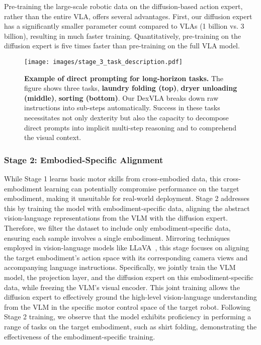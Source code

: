 Pre-training the large-scale robotic data on the diffusion-based action expert, rather than the entire VLA, offers several advantages. First, our diffusion expert has a significantly smaller parameter count compared to VLAs (1 billion vs. 3 billion), resulting in much faster training. Quantitatively, pre-training on the diffusion expert is five times faster than pre-training on the full VLA model.

\begin{figure*}[t]
    \centering
    \texttt{[image: images/stage\_3\_task\_description.pdf]}
    \caption{\textbf{Example of direct prompting for long-horizon tasks. } The figure shows three tasks, \textbf{laundry folding (top)}, \textbf{dryer unloading (middle)},  \textbf{sorting (bottom)}. Our DexVLA breaks down raw instructions into sub-steps automatically. Success in these tasks necessitates not only dexterity but also the capacity to decompose direct prompts into implicit multi-step reasoning and to comprehend the visual context.}\label{fig:hard_task_suite}
\end{figure*}
\subsubsection{Stage 2: Embodied-Specific Alignment}
While Stage 1 learns basic motor skills from cross-embodied data, this cross-embodiment learning can potentially compromise performance on the target embodiment, making it unsuitable for real-world deployment. Stage 2 addresses this by training the model with embodiment-specific data, aligning the abstract vision-language representations from the VLM with the diffusion expert. Therefore, we filter the dataset to include only embodiment-specific data, ensuring each sample involves a single embodiment. Mirroring techniques employed in vision-language models like LLaVA~\cite{liu2024visual,liu2024improved}, this stage focuses on aligning the target embodiment's action space with its corresponding camera views and accompanying language instructions. Specifically, we jointly train the VLM model, the projection layer, and the diffusion expert on this embodiment-specific data, while freezing the VLM's visual encoder. This joint training allows the diffusion expert to effectively ground the high-level vision-language understanding from the VLM in the specific motor control space of the target robot. Following Stage 2 training, we observe that the model exhibits proficiency in performing a range of tasks on the target embodiment, such as shirt folding, demonstrating the effectiveness of the embodiment-specific training. 


